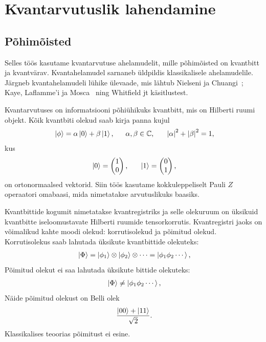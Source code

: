 \documentclass[12pt]{report}
\def\abs#1{\left|#1\right|}
\def\ket#1{\left|#1\right>}
\begin{document}
\chapter{Kvantarvutuslik lahendamine}\label{chap:qcomp}

\section{Põhimõisted}

Selles töös kasutame kvantarvutuse ahelamudelit, mille põhimõisted on kvantbitt ja kvantvärav.
Kvantahelamudel sarnaneb üldpildis klassikalisele ahelamudelile.
Järgneb kvantahelamudeli lühike ülevaade, mis lähtub Nielseni ja Chuangi~\cite{nielsen+chuang}; Kaye, Laflamme'i ja Mosca~\cite{kaye+laflamme+mosca} ning Whitfield jt  \cite{whitfield+etal2011, whitfield+etal2022} käsitlustest.

Kvantarvutuses on informatsiooni põhiühikuks kvantbitt, mis on Hilberti ruumi objekt.
Kõik kvantbiti olekud saab kirja panna kujul
\begin{align}
    \ket{\phi} = \alpha \ket{0} + \beta \ket{1} \rlap{,}
    \qquad \alpha, \beta \in \mathbb{C} \rlap{,}
    \qquad \abs{\alpha}^2 + \abs{\beta}^2 = 1 \rlap{,}
\end{align}
kus
\begin{align}\label{eq:compbasis}
    \ket{0} = \begin{pmatrix}
        1 \\
        0 \\
    \end{pmatrix} \rlap{,}
    \qquad
    \ket{1} = \begin{pmatrix}
        0 \\
        1 \\
    \end{pmatrix} \rlap{,}
\end{align}
on ortonormaalsed vektorid.
Siin töös kasutame kokkuleppeliselt Pauli \(Z\) operaatori omabaasi, mida nimetatakse arvutuslikuks baasiks.

Kvantbittide kogumit nimetatakse kvantregistriks ja selle olekuruum on üksikuid kvantbitte iseloomustavate Hilberti ruumide tensorkorrutis.
Kvantregistri jaoks on võimalikud kahte moodi olekud: korrutisolekud ja põimitud olekud.
Korrutisolekus saab lahutada üksikute kvantbittide olekuteks:
\begin{align}
    \ket{\Phi}
    = \ket{\phi_1} \otimes \ket{\phi_2} \otimes \cdots
    = \ket{\phi_1 \phi_2 \cdots} \rlap{,}
\end{align}
Põimitud olekut ei saa lahutada üksikute bittide olekuteks:
\begin{align}
    \ket{\Phi}
    \ne \ket{\phi_1 \phi_2 \cdots} \rlap{,}
\end{align}
Näide põimitud olekust on Belli olek
\begin{align}
    \frac{\ket{00} + \ket{11}}{\sqrt 2} \rlap{.}
\end{align}
Klassikalises teoorias põimitust ei esine.
\end{document}
